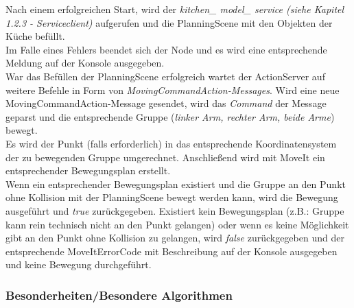 \documentclass{suturo}
\begin{document}
Nach einem erfolgreichen Start, wird der \textit{kitchen\_ model\_ service (siehe Kapitel 1.2.3 - Serviceclient)} aufgerufen und die PlanningScene mit den Objekten der Küche befüllt. \\
Im Falle eines Fehlers beendet sich der Node und es wird eine entsprechende Meldung auf der Konsole ausgegeben. \\
War das Befüllen der PlanningScene erfolgreich wartet der ActionServer auf weitere Befehle in Form von \textit{MovingCommandAction-Messages}.
Wird eine neue MovingCommandAction-Message gesendet, wird das \textit{Command} der Message geparst und die entsprechende Gruppe (\textit{linker Arm, rechter Arm, beide Arme}) bewegt. \\
Es wird der Punkt (falls erforderlich) in das entsprechende Koordinatensystem der zu bewegenden Gruppe umgerechnet. Anschließend wird mit MoveIt ein entsprechender Bewegungsplan erstellt.\\ 
Wenn ein entsprechender Bewegungsplan existiert und die Gruppe an den Punkt ohne Kollision mit der PlanningScene bewegt werden kann, wird die Bewegung ausgeführt und \textit{true} zurückgegeben.
Existiert kein Bewegungsplan (z.B.: Gruppe kann rein technisch nicht an den Punkt gelangen) oder  wenn es keine Möglichkeit gibt an den Punkt ohne Kollision zu gelangen, wird \textit{false} zurückgegeben und der entsprechende MoveItErrorCode mit Beschreibung auf der Konsole ausgegeben und keine Bewegung durchgeführt. \\


\subsubsection{Besonderheiten/Besondere Algorithmen}
\end{document}
